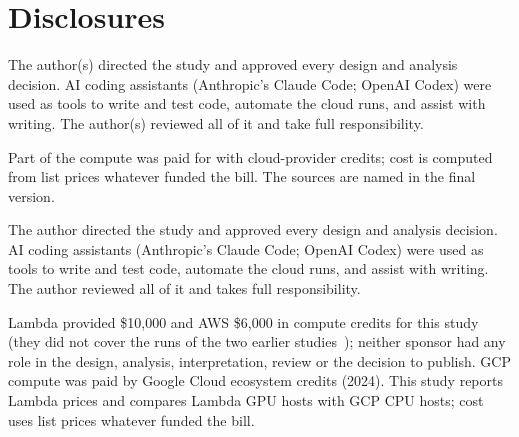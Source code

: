 \documentclass[sigconf]{acmart}
\begin{document}
\ifanon
\section*{Disclosures}
\label{sec:disclosures}
The author(s) directed the study and approved every design and analysis decision. AI coding
assistants (Anthropic's Claude Code; OpenAI Codex) were used as tools to write and test code,
automate the cloud runs, and assist with writing. The author(s) reviewed all of it and take full
responsibility.

Part of the compute was paid for with cloud-provider credits; cost is computed from list prices
whatever funded the bill. The sources are named in the final version.
\fi

\ifanon\else
\begin{acks}
The author directed the study and approved every design and analysis decision. AI coding
assistants (Anthropic's Claude Code; OpenAI Codex) were used as tools to write and test code,
automate the cloud runs, and assist with writing. The author reviewed all of it and takes full
responsibility.

Lambda provided \$10,000 and AWS \$6,000 in compute credits for this study (they did not cover the
runs of the two earlier studies~\cite{ejiofor2026p1,ejiofor2026p2}); neither sponsor had any role in
the design, analysis, interpretation, review or the decision to publish. GCP compute was paid by
Google Cloud ecosystem credits (2024). This study reports Lambda prices and compares Lambda GPU
hosts with GCP CPU hosts; cost uses list prices whatever funded the bill.

\end{acks}
\fi
\end{document}
